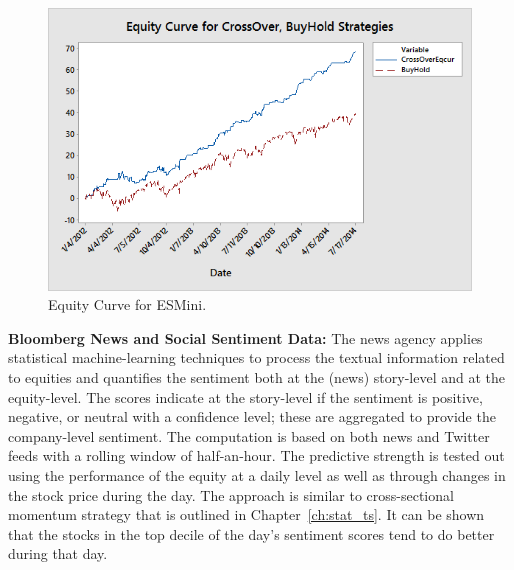         \begin{figure}[!ht]
        \centering
        \includegraphics[width=\textwidth]{chapters/chapter_news_an/figures/ch4sec4equitycross} 
        \caption{Equity Curve for ESMini. \label{fig:equitycross}}
        \end{figure}

\noindent \textbf{Bloomberg News and Social Sentiment Data:} The news agency applies statistical machine-learning techniques to process the textual information related to equities and quantifies the sentiment both at the (news) story-level and at the equity-level. The scores indicate at the story-level if the sentiment is positive, negative, or neutral with a confidence level; these are aggregated to provide the company-level sentiment. The computation is based on both news and Twitter feeds with a rolling window of half-an-hour. The predictive strength is tested out using the performance of the equity at a daily level as well as through changes in the stock price during the day. The approach is similar to cross-sectional momentum strategy that is outlined in Chapter~\ref{ch:stat_ts}. It can be shown that the stocks in the top decile of the day's sentiment scores tend to do better during that day. 


